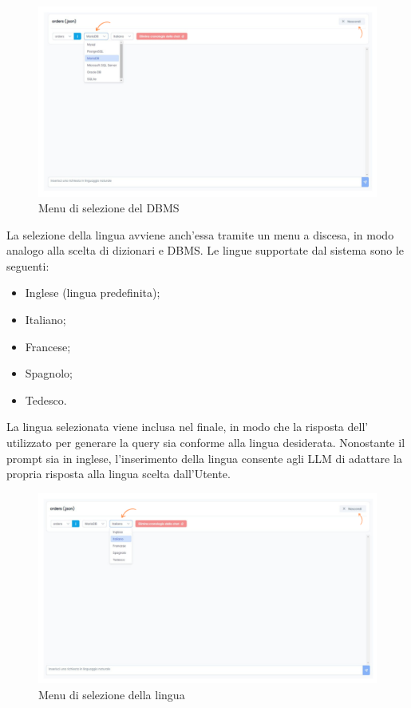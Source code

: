 \begin{figure}[H]
  \centering
  \includegraphics[width=1\textwidth]{assets/cambio_dbms.png}
  \caption{Menu di selezione del DBMS}
\end{figure}

 \label{sec:lingua-chat}

\par La selezione della lingua avviene anch'essa tramite un menu a discesa, in modo analogo alla scelta di dizionari e DBMS. Le lingue supportate dal sistema sono le seguenti:
\begin{itemize}
  \item Inglese (lingua predefinita);
  \item Italiano;
  \item Francese;
  \item Spagnolo;
  \item Tedesco.
\end{itemize}

\vspace{0.5\baselineskip}
\par La lingua selezionata viene inclusa nel  finale, in modo che la risposta dell' utilizzato per generare la query  sia conforme alla lingua desiderata. Nonostante il prompt sia in inglese, l'inserimento della lingua consente agli LLM di adattare la propria risposta alla lingua scelta dall'Utente.

\begin{figure}[H]
  \centering
  \includegraphics[width=1\textwidth]{assets/cambio_lingua.png}
  \caption{Menu di selezione della lingua}
\end{figure}

